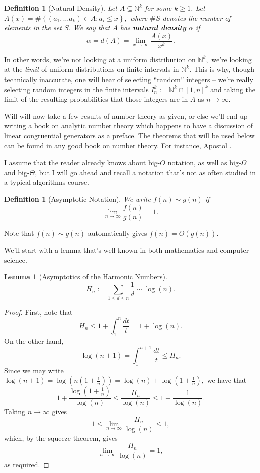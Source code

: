 \documentclass[11pt]{article}
\newtheorem{lemma}[theorem]{Lemma}
\newtheorem{definition}[theorem]{Definition}
\begin{document}
\begin{definition}[Natural Density]
Let $A\subseteq \mathbb{N}^{k}$ for some $k\geq 1$. Let $A\left(x\right) = \#\left\{\left(a_{1},\ldots a_{k}\right)\in A : a_{i} \leq x\right\},$ where $\#S$ denotes the number of elements in the set $S$. We say that $A$ has {\bf natural density} $\alpha$ if $$\alpha = d\left(A\right) = \lim_{x\to\infty} \frac{A\left(x\right)}{x^{k}}.$$
\end{definition}

In other words, we're not looking at a uniform distribution on $\mathbb{N}^{k},$ we're looking at the {\it limit} of uniform distributions on finite intervals in $\mathbb{N}^{k}.$ This is why, though technically inaccurate, one will hear of selecting ``random'' integers -- we're really selecting random integers in the finite intervals $I_{n}^{k} := \mathbb{N}^{k}\cap\left[1,n\right]^{k}$ and taking the limit of the resulting probabilities that those integers are in $A$ as $n\to\infty$.

Will will now take a few results of number theory as given, or else we'll end up writing a book on analytic number theory which happens to have a discussion of linear congruential generators as a preface. The theorems that will be used below can be found in any good book on number theory. For instance, Apostol \cite{apostol_2011}.

I assume that the reader already knows about big-$O$ notation, as well as big-$\Omega$ and big-$\Theta$, but I will go ahead and recall a notation that's not as often studied in a typical algorithms course.

\begin{definition}[Asymptotic Notation]
We write $f\left(n\right)\sim g\left(n\right)$ if $$\lim_{n\to\infty}\frac{f\left(n\right)}{g\left(n\right)} = 1.$$
\end{definition}

Note that $f\left(n\right)\sim g\left(n\right)$ automatically gives $f\left(n\right) = O\left(g\left(n\right)\right).$

We'll start with a lemma that's well-known in both mathematics and computer science.

\begin{lemma}[Asymptotics of the Harmonic Numbers]
\label{lem:log}
$$H_{n} := \sum_{1\leq d\leq n} \frac{1}{d} \sim \log\left(n\right).$$
\end{lemma}
\begin{proof}
First, note that $$H_{n}\leq 1 + \int_{1}^{n}\frac{dt}{t} = 1 + \log\left(n\right).$$ On the other hand, $$\log\left(n+1\right) = \int_{1}^{n+1}\frac{dt}{t} \leq H_{n}.$$ Since we may write $\log\left(n+1\right) = \log\left(n\left(1+\frac{1}{n}\right)\right) = \log\left(n\right) + \log\left(1 + \frac{1}{n}\right),$ we have that $$1 + \frac{\log\left(1 + \frac{1}{n}\right)}{\log\left(n\right)} \leq \frac{H_{n}}{\log\left(n\right)}\leq 1 + \frac{1}{\log\left(n\right)}.$$ Taking $n\to\infty$ gives $$1 \leq \lim_{n\to\infty}\frac{H_{n}}{\log\left(n\right)} \leq 1,$$ which, by the squeeze theorem, gives $$\lim_{n\to\infty}\frac{H_{n}}{\log\left(n\right)} = 1,$$ as required.
\end{proof}
\end{document}
